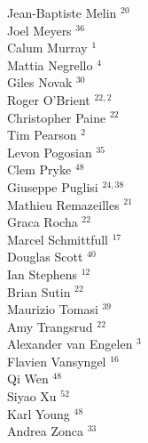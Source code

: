 \documentclass[PICOReport.tex]{subfiles}
\begin{document}
{\begin{multicols}{4}
Jean-Baptiste Melin $^{20}$             \\
Joel Meyers $^{36}$                     \\
Calum Murray $^{1}$                    \\
Mattia Negrello $^{4}$                 \\
Giles Novak $^{30}$                     \\
Roger O'Brient $^{22,2}$                  \\
Christopher Paine $^{22}$               \\
Tim Pearson $^{2}$                     \\
Levon Pogosian $^{35}$                  \\
Clem Pryke $^{48}$                      \\
Giuseppe Puglisi $^{24,38}$                \\
Mathieu Remazeilles $^{21}$             \\
Graca Rocha $^{22}$                     \\
Marcel Schmittfull $^{17}$              \\
Douglas Scott $^{40}$                   \\
Ian Stephens $^{12}$                    \\
Brian Sutin $^{22}$                     \\
Maurizio Tomasi $^{39}$                 \\
Amy Trangsrud $^{22}$                   \\
Alexander van Engelen $^{3}$           \\
Flavien Vansyngel $^{16}$               \\
Qi Wen $^{48}$                          \\
Siyao Xu $^{52}$                        \\
Karl Young $^{48}$                      \\
Andrea Zonca $^{33}$
\end{multicols}
}
\end{document}
